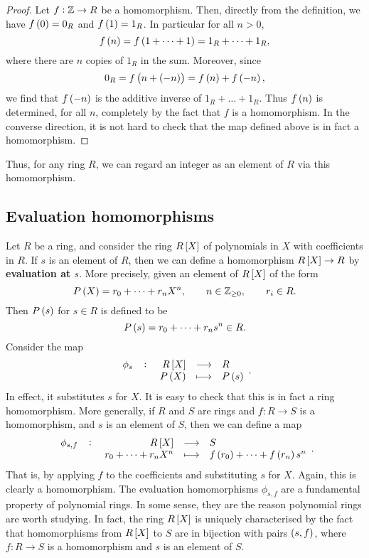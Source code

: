 \begin{proof}
Let $ f : \mathbb{Z} \to R $ be a homomorphism. Then, directly from the definition, we have $ f\br{0} = 0_R $ and $ f\br{1} = 1_R $. In particular for all $ n > 0 $,
$$ f\br{n} = f\br{1 + \dots + 1} = 1_R + \dots + 1_R, $$
where there are $ n $ copies of $ 1_R $ in the sum. Moreover, since
$$ 0_R = f\br{n + \br{-n}} = f\br{n} + f\br{-n}, $$
we find that $ f\br{-n} $ is the additive inverse of $ 1_R + \dots + 1_R $. Thus $ f\br{n} $ is determined, for all $ n $, completely by the fact that $ f $ is a homomorphism. In the converse direction, it is not hard to check that the map defined above is in fact a homomorphism.
\end{proof}

Thus, for any ring $ R $, we can regard an integer as an element of $ R $ via this homomorphism.

\pagebreak

\subsection{Evaluation homomorphisms}

Let $ R $ be a ring, and consider the ring $ R\sbr{X} $ of polynomials in $ X $ with coefficients in $ R $. If $ s $ is an element of $ R $, then we can define a homomorphism $ R\sbr{X} \to R $ by \textbf{evaluation at $ s $}. More precisely, given an element of $ R\sbr{X} $ of the form
$$ P\br{X} = r_0 + \dots + r_nX^n, \qquad n \in \Z_{\ge 0}, \qquad r_i \in R. $$
Then $ P\br{s} $ for $ s \in R $ is defined to be
$$ P\br{s} = r_0 + \dots + r_ns^n \in R. $$
Consider the map
$$ \function[\phi_s]{R\sbr{X}}{R}{P\br{X}}{P\br{s}}. $$
In effect, it substitutes $ s $ for $ X $. It is easy to check that this is in fact a ring homomorphism. More generally, if $ R $ and $ S $ are rings and $ f : R \to S $ is a homomorphism, and $ s $ is an element of $ S $, then we can define a map
$$ \function[\phi_{s, f}]{R\sbr{X}}{S}{r_0 + \dots + r_nX^n}{f\br{r_0} + \dots + f\br{r_n}s^n}. $$
That is, by applying $ f $ to the coefficients and substituting $ s $ for $ X $. Again, this is clearly a homomorphism. The evaluation homomorphisms $ \phi_{s, f} $ are a fundamental property of polynomial rings. In some sense, they are the reason polynomial rings are worth studying. In fact, the ring $ R\sbr{X} $ is uniquely characterised by the fact that homomorphisms from $ R\sbr{X} $ to $ S $ are in bijection with pairs $ \br{s, f} $, where $ f : R \to S $ is a homomorphism and $ s $ is an element of $ S $.

